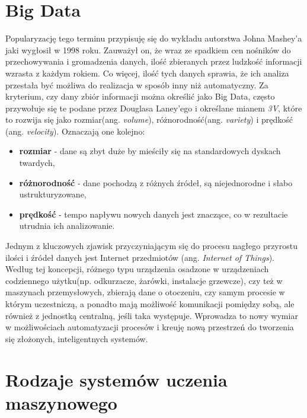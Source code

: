 \section{Big Data}

Popularyzację tego terminu przypisuję się do wykładu autorstwa Johna Mashey'a\cite{mashey} jaki wygłosił w 1998 roku. Zauważył on, że wraz ze spadkiem cen nośników do przechowywania i gromadzenia danych, ilość zbieranych przez ludzkość informacji wzrasta z każdym rokiem. Co więcej, ilość tych danych sprawia, że ich analiza przestała być możliwa do realizacja w sposób inny niż automatyczny. Za kryterium, czy dany zbiór informacji można określić jako Big Data, często przywołuje się te podane przez Douglasa Laney'ego\cite{laney} i określane mianem \textit{3V}, które to rozwija się jako rozmiar(ang. \textit{volume}), różnorodność(ang. \textit{variety}) i prędkość (ang. \textit{velocity}). Oznaczają one kolejno:
\begin{itemize}
	\item \textbf{rozmiar} - dane są zbyt duże by mieściły się na standardowych dyskach twardych,
	\item \textbf{różnorodność} - dane pochodzą z różnych źródeł, są niejednorodne i słabo ustrukturyzowane,
	\item \textbf{prędkość} - tempo napływu nowych danych jest znaczące, co w rezultacie utrudnia ich analizowanie.
\\
\end{itemize}

Jednym z kluczowych zjawisk przyczyniającym się do procesu nagłego przyrostu ilości i źródeł danych jest Internet przedmiotów (ang. \textit{Internet of Things}\cite{iot}). Według tej koncepcji, różnego typu urządzenia osadzone w urządzeniach codziennego użytku(np. odkurzacze, żarówki, instalacje grzewcze), czy też w maszynach przemysłowych, zbierają dane o otoczeniu, czy samym procesie w którym uczestniczą, a ponadto mają możliwość komunikacji pomiędzy sobą, ale również z jednostką centralną, jeśli taka występuje. Wprowadza to nowy wymiar w możliwościach automatyzacji procesów i kreuję nową przestrzeń do tworzenia się złożonych, inteligentnych systemów.

\section{Rodzaje systemów uczenia maszynowego}

